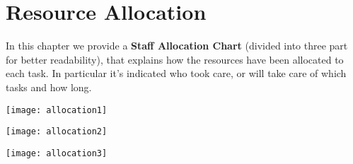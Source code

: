 \pagebreak
\section{Resource Allocation}
In this chapter we provide a \textbf{Staff Allocation Chart} (divided into three part for better readability), that explains how the resources have been allocated to each task. In particular it's indicated who took care, or will take care of which tasks and how long. 

\begin{center}
	\texttt{[image: allocation1]}
\end{center}

\begin{center}
	\texttt{[image: allocation2]}
\end{center}

\begin{center}
	\texttt{[image: allocation3]}
\end{center}
